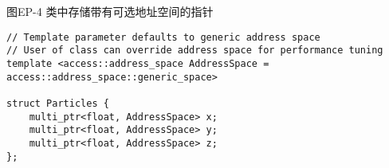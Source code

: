 \hspace*{\fill} \par %
图EP-4 类中存储带有可选地址空间的指针
\begin{lstlisting}[caption={}]
// Template parameter defaults to generic address space
// User of class can override address space for performance tuning
template <access::address_space AddressSpace =
access::address_space::generic_space>

struct Particles {
	multi_ptr<float, AddressSpace> x;
	multi_ptr<float, AddressSpace> y;
	multi_ptr<float, AddressSpace> z;
};
\end{lstlisting}





















































